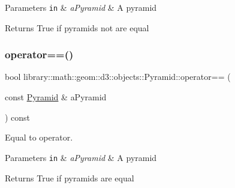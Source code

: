 \begin{DoxyParams}[1]{Parameters}
\mbox{\tt in}  & {\em a\+Pyramid} & A pyramid \\
\hline
\end{DoxyParams}
\begin{DoxyReturn}{Returns}
True if pyramids not are equal 
\end{DoxyReturn}
\mbox{\label{classlibrary_1_1math_1_1geom_1_1d3_1_1objects_1_1_pyramid_adfb99bef5bd74a3b0fe75dcf0c61bd61}} 
\subsubsection{\texorpdfstring{operator==()}{operator==()}}
{\footnotesize\ttfamily bool library\+::math\+::geom\+::d3\+::objects\+::\+Pyramid\+::operator== (\begin{DoxyParamCaption}\item[{const \hyperlink{classlibrary_1_1math_1_1geom_1_1d3_1_1objects_1_1_pyramid}{Pyramid} \&}]{a\+Pyramid }\end{DoxyParamCaption}) const}



Equal to operator. 


\begin{DoxyCode}
\end{DoxyCode}



\begin{DoxyParams}[1]{Parameters}
\mbox{\tt in}  & {\em a\+Pyramid} & A pyramid \\
\hline
\end{DoxyParams}
\begin{DoxyReturn}{Returns}
True if pyramids are equal 
\end{DoxyReturn}
\mbox{\label{classlibrary_1_1math_1_1geom_1_1d3_1_1objects_1_1_pyramid_a06b022532e8477f4c4197e497113af99}} 
